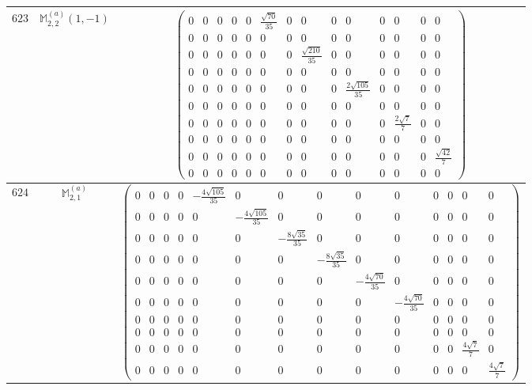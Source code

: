 \documentclass[fleqn,8pt,landscape]{jsarticle}
\begin{document}
\begin{center}
\begin{longtable}{ccc}
$ 623 $ & $ \mathbb{M}_{2,2}^{(a)}(1,-1) $ & $ \begin{pmatrix} 0 & 0 & 0 & 0 & 0 & \frac{\sqrt{70}}{35} & 0 & 0 & 0 & 0 & 0 & 0 & 0 & 0 \\ 0 & 0 & 0 & 0 & 0 & 0 & 0 & 0 & 0 & 0 & 0 & 0 & 0 & 0 \\ 0 & 0 & 0 & 0 & 0 & 0 & 0 & \frac{\sqrt{210}}{35} & 0 & 0 & 0 & 0 & 0 & 0 \\ 0 & 0 & 0 & 0 & 0 & 0 & 0 & 0 & 0 & 0 & 0 & 0 & 0 & 0 \\ 0 & 0 & 0 & 0 & 0 & 0 & 0 & 0 & 0 & \frac{2 \sqrt{105}}{35} & 0 & 0 & 0 & 0 \\ 0 & 0 & 0 & 0 & 0 & 0 & 0 & 0 & 0 & 0 & 0 & 0 & 0 & 0 \\ 0 & 0 & 0 & 0 & 0 & 0 & 0 & 0 & 0 & 0 & 0 & \frac{2 \sqrt{7}}{7} & 0 & 0 \\ 0 & 0 & 0 & 0 & 0 & 0 & 0 & 0 & 0 & 0 & 0 & 0 & 0 & 0 \\ 0 & 0 & 0 & 0 & 0 & 0 & 0 & 0 & 0 & 0 & 0 & 0 & 0 & \frac{\sqrt{42}}{7} \\ 0 & 0 & 0 & 0 & 0 & 0 & 0 & 0 & 0 & 0 & 0 & 0 & 0 & 0 \end{pmatrix} $ \\ \hline
$ 624 $ & $ \mathbb{M}_{2,1}^{(a)} $ & $ \begin{pmatrix} 0 & 0 & 0 & 0 & - \frac{4 \sqrt{105}}{35} & 0 & 0 & 0 & 0 & 0 & 0 & 0 & 0 & 0 \\ 0 & 0 & 0 & 0 & 0 & - \frac{4 \sqrt{105}}{35} & 0 & 0 & 0 & 0 & 0 & 0 & 0 & 0 \\ 0 & 0 & 0 & 0 & 0 & 0 & - \frac{8 \sqrt{35}}{35} & 0 & 0 & 0 & 0 & 0 & 0 & 0 \\ 0 & 0 & 0 & 0 & 0 & 0 & 0 & - \frac{8 \sqrt{35}}{35} & 0 & 0 & 0 & 0 & 0 & 0 \\ 0 & 0 & 0 & 0 & 0 & 0 & 0 & 0 & - \frac{4 \sqrt{70}}{35} & 0 & 0 & 0 & 0 & 0 \\ 0 & 0 & 0 & 0 & 0 & 0 & 0 & 0 & 0 & - \frac{4 \sqrt{70}}{35} & 0 & 0 & 0 & 0 \\ 0 & 0 & 0 & 0 & 0 & 0 & 0 & 0 & 0 & 0 & 0 & 0 & 0 & 0 \\ 0 & 0 & 0 & 0 & 0 & 0 & 0 & 0 & 0 & 0 & 0 & 0 & 0 & 0 \\ 0 & 0 & 0 & 0 & 0 & 0 & 0 & 0 & 0 & 0 & 0 & 0 & \frac{4 \sqrt{7}}{7} & 0 \\ 0 & 0 & 0 & 0 & 0 & 0 & 0 & 0 & 0 & 0 & 0 & 0 & 0 & \frac{4 \sqrt{7}}{7} \end{pmatrix} $ \\ \hline

\end{longtable}
\end{center}
\end{document}
